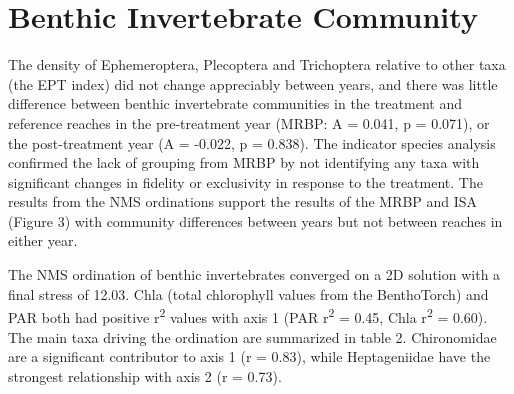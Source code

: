 \documentclass[double,12pt]{beavtex}
\begin{document}
  \section*{Benthic Invertebrate
  Community}\label{benthic-invertebrate-community}
  
  The density of Ephemeroptera, Plecoptera and Trichoptera relative to
  other taxa (the EPT index) did not change appreciably between years, and
  there was little difference between benthic invertebrate communities in
  the treatment and reference reaches in the pre-treatment year (MRBP: A =
  0.041, p = 0.071), or the post-treatment year (A = -0.022, p = 0.838).
  The indicator species analysis confirmed the lack of grouping from MRBP
  by not identifying any taxa with significant changes in fidelity or
  exclusivity in response to the treatment. The results from the NMS
  ordinations support the results of the MRBP and ISA (Figure 3) with
  community differences between years but not between reaches in either
  year.
  
  The NMS ordination of benthic invertebrates converged on a 2D solution
  with a final stress of 12.03. Chla (total chlorophyll values from the
  BenthoTorch) and PAR both had positive r\textsuperscript{2} values with
  axis 1 (PAR r\textsuperscript{2} = 0.45, Chla r\textsuperscript{2} =
  0.60). The main taxa driving the ordination are summarized in table 2.
  Chironomidae are a significant contributor to axis 1 (r = 0.83), while
  Heptageniidae have the strongest relationship with axis 2 (r = 0.73).
  
\end{document}
